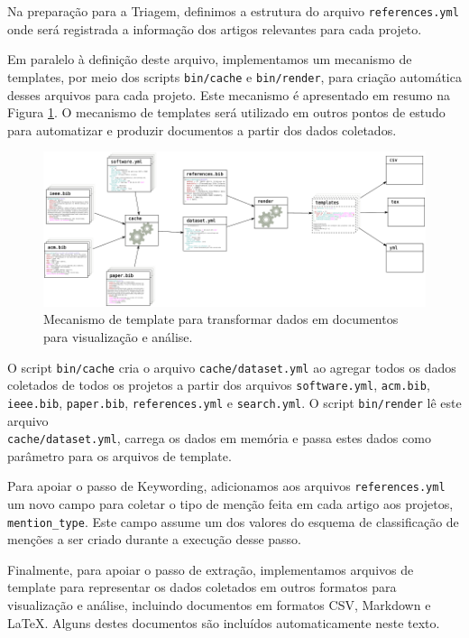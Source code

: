 Na preparação para a Triagem,
definimos a estrutura do arquivo \texttt{references.yml} onde será registrada a
informação dos artigos relevantes para cada projeto.

Em paralelo à definição deste arquivo, implementamos um mecanismo de templates,
por meio dos scripts \texttt{bin/cache} e \texttt{bin/render}, para criação
automática desses arquivos para cada projeto. 
Este mecanismo é apresentado em resumo na Figura
\ref{template-fluxograma}.
O mecanismo de templates será
utilizado em outros pontos de estudo para automatizar e produzir documentos a
partir dos dados coletados.

\begin{figure}[h]
  \center
  \includegraphics[scale=0.3]{imagens/template-fluxograma.png}
  \caption{Mecanismo de template para transformar dados em documentos para visualização e análise.}
  \label{template-fluxograma}
\end{figure}

O script \texttt{bin/cache} cria o arquivo \texttt{cache/dataset.yml} ao
agregar todos os dados coletados de todos os projetos a partir dos arquivos
\texttt{software.yml}, \texttt{acm.bib}, \texttt{ieee.bib}, \texttt{paper.bib},
\texttt{references.yml} e \texttt{search.yml}. O script \texttt{bin/render} lê
este arquivo \\ \texttt{cache/dataset.yml}, carrega os dados em memória e passa
estes dados como parâmetro para os arquivos de template.

Para apoiar o passo de Keywording, 
adicionamos aos arquivos \texttt{references.yml} um novo campo para coletar o
tipo de menção feita em cada artigo aos projetos, \texttt{mention\_type}. 
Este campo assume um dos valores do esquema de classificação de menções 
a ser criado durante a execução desse passo.

Finalmente, para apoiar o passo de extração, 
implementamos arquivos de template para representar os dados coletados em
outros formatos para visualização e análise, incluindo documentos em formatos
CSV, Markdown e \LaTeX. Alguns destes documentos são incluídos automaticamente
neste texto.

